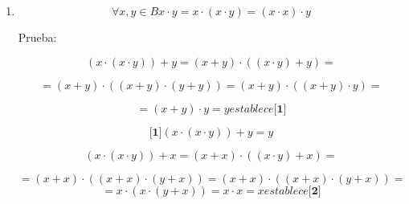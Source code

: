 \begin{enumerate}
\begin{enumerate}
\begin{enumerate}
\begin{enumerate}
\begin{enumerate}
          \[{\lbrack\mathbf{1}\rbrack}{{{({x + {({x + y})}})} \cdot y} = y}\]

          \[{}{}{{{{({x + {({x + y})}})} \cdot x} = {{({x \cdot x})} + {({{({x + y})} \cdot x})}}} =}\]

          \[{}{{{= {{({x \cdot x})} + {({{x \cdot x} + {y \cdot x}})}}} = {{({x \cdot x})} + {({{x \cdot x} + x})}}} =}\]

          \[{}{{= {{({x \cdot x})} + x}} = x}{}{}{}\mathit{establece}{\lbrack\mathbf{2}\rbrack}\]

          \[{\lbrack\mathbf{2}\rbrack}{{{({x + {({x + y})}})} \cdot x} = x}\]

          \[\mathit{De}{\lbrack\mathbf{1}\rbrack}y\mathit{de}{\lbrack\mathbf{2}\rbrack}\mathit{obtenemos}:\]

          \[{{x + y} = {{\lbrack{{({x + {({x + y})}})} \cdot x}\rbrack} + {\lbrack{{({x + {({x + y})}})} \cdot y}\rbrack}}} =\]

          \[{{= {{({x + {({x + y})}})} \cdot {({x + y})}}} = {{({x + {({x + y})}})} \cdot {({{({x + y})} + {({x + y})}})}}} =\]

          \[{= {{({{({x + {({x + y})}})} \cdot {({x + y})}})} + {({{({x + {({x + y})}})} \cdot {({x + y})}})}}} =\]

          \[= {x + {({x + y})}}\]

          \[{{{({x + x})} + y} = {x + y}} = {x + {({x + y})}}\]
        \item
          \[\forall x,{y \in B}{{{x \cdot y} = {x \cdot {({x \cdot y})}}} = {{({x \cdot x})} \cdot y}}\]

          Prueba:

          \[{}{}{{{{({x \cdot {({x \cdot y})}})} + y} = {{({x + y})} \cdot {({{({x \cdot y})} + y})}}} =}\]

          \[{{= {{({x + y})} \cdot {({{({x + y})} \cdot {({y + y})}})}}} = {{({x + y})} \cdot {({{({x + y})} \cdot y})}}} = {}\]

          \[{{= {{({x + y})} \cdot y}} = y}{}{}{}\mathit{establece}{\lbrack\mathbf{1}\rbrack}\]

          \[{\lbrack\mathbf{1}\rbrack}{{{({x \cdot {({x \cdot y})}})} + y} = y}\]

          \[{}{}{{{{({x \cdot {({x \cdot y})}})} + x} = {{({x + x})} \cdot {({{({x \cdot y})} + x})}}} =}\]

          \[{{= {{({x + x})} \cdot {({{({x + x})} \cdot {({y + x})}})}}} = {{({x + x})} \cdot {({{({x + x})} \cdot {({y + x})}})}}} = {}\]\[{{{= {x \cdot {({x \cdot {({y + x})}})}}} = {x \cdot x}} = x}{}{}{}\mathit{establece}{\lbrack\mathbf{2}\rbrack}\]


\end{enumerate}
\end{enumerate}
\end{enumerate}
\end{enumerate}
\end{enumerate}
